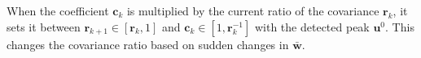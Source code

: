 \documentclass[class=article, crop=false]{standalone}
\begin{document}
\vspace{0.5cm}

When the coefficient $ \textbf{c}_k $ is  multiplied by the current ratio of the covariance $ \textbf{r}_k $, it sets it between $ \textbf{r}_{k+1} \in [\textbf{r}_k,1] $ and $ \textbf{c}_k \in [1, \textbf{r}^{-1}_{k}] $ with the detected peak $ \textbf{u}^0 $. This changes the covariance ratio based on sudden changes in $ \bar{\textbf{w}} $.

\end{document}
